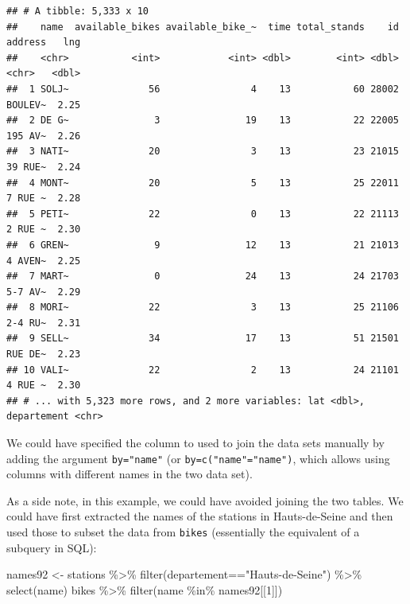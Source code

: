 \documentclass[
]{book}
\newenvironment{Shaded}{\begin{snugshade}}{\end{snugshade}}
\newcommand{\DecValTok}[1]{\textcolor[rgb]{0.00,0.00,0.81}{#1}}
\newcommand{\FunctionTok}[1]{\textcolor[rgb]{0.00,0.00,0.00}{#1}}
\newcommand{\NormalTok}[1]{#1}
\newcommand{\OtherTok}[1]{\textcolor[rgb]{0.56,0.35,0.01}{#1}}
\newcommand{\SpecialCharTok}[1]{\textcolor[rgb]{0.00,0.00,0.00}{#1}}
\newcommand{\StringTok}[1]{\textcolor[rgb]{0.31,0.60,0.02}{#1}}
\begin{document}
\begin{verbatim}
## # A tibble: 5,333 x 10
##    name  available_bikes available_bike_~  time total_stands    id address   lng
##    <chr>           <int>            <int> <dbl>        <int> <dbl> <chr>   <dbl>
##  1 SOLJ~              56                4    13           60 28002 BOULEV~  2.25
##  2 DE G~               3               19    13           22 22005 195 AV~  2.26
##  3 NATI~              20                3    13           23 21015 39 RUE~  2.24
##  4 MONT~              20                5    13           25 22011 7 RUE ~  2.28
##  5 PETI~              22                0    13           22 21113 2 RUE ~  2.30
##  6 GREN~               9               12    13           21 21013 4 AVEN~  2.25
##  7 MART~               0               24    13           24 21703 5-7 AV~  2.29
##  8 MORI~              22                3    13           25 21106 2-4 RU~  2.31
##  9 SELL~              34               17    13           51 21501 RUE DE~  2.23
## 10 VALI~              22                2    13           24 21101 4 RUE ~  2.30
## # ... with 5,323 more rows, and 2 more variables: lat <dbl>, departement <chr>
\end{verbatim}

We could have specified the column to used to join the data sets manually by adding the argument \texttt{by="name"} (or \texttt{by=c("name"="name")}, which allows using columns with different names in the two data set).

As a side note, in this example, we could have avoided joining the two tables. We could have first extracted the names of the stations in Hauts-de-Seine and then used those to subset the data from \texttt{bikes} (essentially the equivalent of a subquery in SQL):

\begin{Shaded}
\begin{Highlighting}[]
\NormalTok{names92 }\OtherTok{\textless{}{-}}\NormalTok{ stations }\SpecialCharTok{\%\textgreater{}\%} \FunctionTok{filter}\NormalTok{(departement}\SpecialCharTok{==}\StringTok{"Hauts{-}de{-}Seine"}\NormalTok{) }\SpecialCharTok{\%\textgreater{}\%}
               \FunctionTok{select}\NormalTok{(name) }
\NormalTok{bikes }\SpecialCharTok{\%\textgreater{}\%} \FunctionTok{filter}\NormalTok{(name }\SpecialCharTok{\%in\%}\NormalTok{ names92[[}\DecValTok{1}\NormalTok{]]) }
\end{Highlighting}
\end{Shaded}
\end{document}
